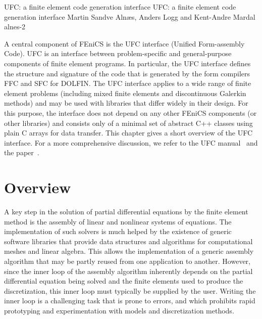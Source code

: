               {UFC: a finite element code generation interface}
              {UFC: a finite element code generation interface}
              {Martin Sandve Aln\ae{}s, Anders Logg and Kent-Andre Mardal}
              {alnes-2}


A central component of FEniCS is the UFC interface (Unified
Form-assembly Code). UFC is an interface between problem-specific and
general-purpose components of finite element programs. In particular,
the UFC interface defines the structure and signature of the code that
is generated by the form compilers FFC and SFC for DOLFIN.
The UFC interface applies to a wide range of finite element problems
(including mixed finite elements and discontinuous Galerkin methods)
and may be used with libraries that differ widely in their design. For
this purpose, the interface does not depend on any other FEniCS
components (or other libraries) and consists only of a minimal set of
abstract C++ classes using plain C arrays for data transfer.
This chapter gives a short overview of the UFC interface. For a more
comprehensive discussion, we refer to the UFC
manual~\citep{AlnaesLangtangenEtAl2007} and the
paper~\citet{AlnaesLoggMardalEtAl2009}.

\section{Overview}
\label{sec:alnes-2overview}

A key step in the solution of partial differential equations by the
finite element method is the assembly of linear and nonlinear systems
of equations. The implementation of such solvers is much helped by the
existence of generic software libraries that provide data structures
and algorithms for computational meshes and linear algebra. This
allows the implementation of a generic assembly algorithm that may be
partly reused from one application to another. However, since the
inner loop of the assembly algorithm inherently depends on the partial
differential equation being solved and the finite elements used to
produce the discretization, this inner loop must typically be supplied
by the user. Writing the inner loop is a challenging task that is
prone to errors, and which prohibits rapid prototyping and
experimentation with models and discretization methods.

